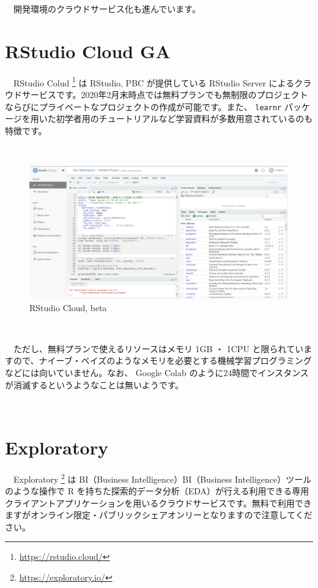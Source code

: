 \documentclass[
  12pt,
]{book}
\DeclareRobustCommand{\href}[2]{#2\footnote{\url{#1}}}
\begin{document}
　開発環境のクラウドサービス化も進んでいます。

\hypertarget{rstudio-cloud-ga}{%
\section{RStudio Cloud GA}\label{rstudio-cloud-ga}}

　\href{https://rstudio.cloud/}{RStudio Colud } は RStudio, PBC が提供している RStudio Server によるクラウドサービスです。2020年2月末時点では無料プランでも無制限のプロジェクトならびにプライベートなプロジェクトの作成が可能です。また、 \texttt{learnr} パッケージを用いた初学者用のチュートリアルなど学習資料が多数用意されているのも特徴です。

　\\

\begin{figure}[H]

{\centering \includegraphics[width=0.8\linewidth,]{fig/RStudio/Cloud} 

}

\caption{RStudio Cloud, beta}\label{fig:unnamed-chunk-147}
\end{figure}

　

　ただし、無料プランで使えるリソースはメモリ 1GB ・ 1CPU と限られていますので、ナイーブ・ベイズのようなメモリを必要とする機械学習プログラミングなどには向いていません。なお、 Google Colab のように24時間でインスタンスが消滅するというようなことは無いようです。

　

\hypertarget{exploratory}{%
\section{Exploratory}\label{exploratory}}

　\href{https://exploratory.io/}{Exploratory } は BI（Business Intelligence）BI（Business Intelligence）ツールのような操作で R を持ちた探索的データ分析（EDA）が行える利用できる専用クライアントアプリケーションを用いるクラウドサービスです。無料で利用できますがオンライン限定・パブリックシェアオンリーとなりますので注意してください。
\end{document}
